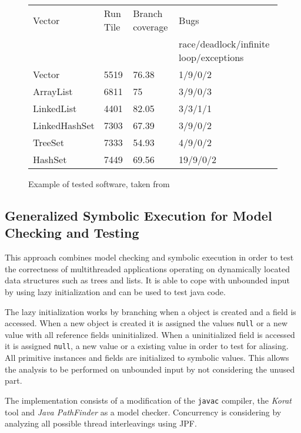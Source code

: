 \documentclass[10pt]{llncs}
\begin{document}
\begin{figure}
	\centering
	
	\begin{tabular}{l l l l}
		Vector & Run Tile & Branch coverage & Bugs \\
		 & & & race/deadlock/infinite loop/exceptions \\
		 
		\hline
		
		Vector & 5519 & 76.38 & 1/9/0/2 \\
		ArrayList & 6811 & 75 & 3/9/0/3 \\
		LinkedList & 4401 & 82.05 & 3/3/1/1 \\
		LinkedHashSet & 7303 & 67.39 & 3/9/0/2 \\
		TreeSet & 7333 & 54.93 & 4/9/0/2 \\
		HashSet & 7449 & 69.56 & 19/9/0/2 \\
	\end{tabular}
	
	\caption{Example of tested software, taken from \cite{base4}}
	\label{example:4}
\end{figure}

\subsection{Generalized Symbolic Execution for Model Checking and Testing \cite{base5}}

This approach combines model checking and symbolic execution in order to test the correctness of multithreaded applications operating on dynamically located data structures such as trees and lists. It is able to cope with unbounded input by using lazy initialization and can be used to test java code.

The lazy initialization works by branching when a object is created and a field is accessed. When a new object is created it is assigned the values \texttt{null} or a new value with all reference fields uninitialized. When a uninitialized field is accessed it is assigned \texttt{null}, a new value or a existing value in order to test for aliasing. All primitive instances and fields are initialized to symbolic values. This allows the analysis to be performed on unbounded input by not considering the unused part.

The implementation consists of a modification of the \texttt{javac} compiler, the \emph{Korat} tool \cite{korat} and \emph{Java PathFinder} \cite{pathfinder} as a model checker. Concurrency is considering by analyzing all possible thread interleavings using JPF.
\end{document}
